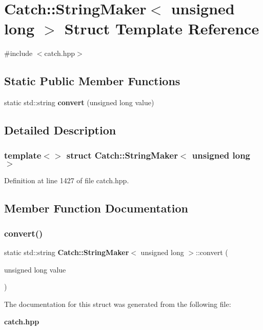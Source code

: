 \section{Catch\+::String\+Maker$<$ unsigned long $>$ Struct Template Reference}
\label{struct_catch_1_1_string_maker_3_01unsigned_01long_01_4}


{\ttfamily \#include $<$catch.\+hpp$>$}

\subsection*{Static Public Member Functions}
\begin{DoxyCompactItemize}
\item 
static std\+::string \textbf{ convert} (unsigned long value)
\end{DoxyCompactItemize}


\subsection{Detailed Description}
\subsubsection*{template$<$$>$\newline
struct Catch\+::\+String\+Maker$<$ unsigned long $>$}



Definition at line 1427 of file catch.\+hpp.



\subsection{Member Function Documentation}
\mbox{\label{struct_catch_1_1_string_maker_3_01unsigned_01long_01_4_ae105dc97e4462a86a61b59667f8423c9}} 
\subsubsection{convert()}
{\footnotesize\ttfamily static std\+::string \textbf{ Catch\+::\+String\+Maker}$<$ unsigned long $>$\+::convert (\begin{DoxyParamCaption}\item[{unsigned long}]{value }\end{DoxyParamCaption})\hspace{0.3cm}{\ttfamily [static]}}



The documentation for this struct was generated from the following file\+:\begin{DoxyCompactItemize}
\item 
\textbf{ catch.\+hpp}\end{DoxyCompactItemize}
